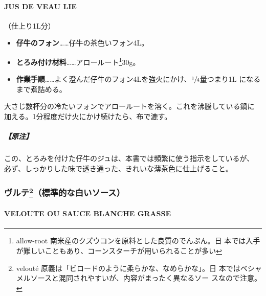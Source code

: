 \documentclass[twoside,12Q,b5j]{escoffierltjsbook}
\begin{document}
\paragraph{JUS DE VEAU LIE}\label{jus-de-veau-lie}


（仕上り1L分）

\begin{itemize}
\item
  \textbf{仔牛のフォン}\ldots{}\ldots{}仔牛の茶色いフォン4L。
\item
  \textbf{とろみ付け材料}\ldots{}\ldots{}アロールート\footnote{allow-root
    南米産のクズウコンを原料とした良質のでんぷん。日
    本では入手が難しいこともあり、コーンスターチが用いられることが多い}30g。
\item
  \textbf{作業手順}\ldots{}\ldots{}よく澄んだ仔牛のフォン4Lを強火にかけ、\(\sfrac{1}{4}\)量つまり1L
  になるまで煮詰める。
\end{itemize}

大さじ数杯分の冷たいフォンでアロールートを溶く。これを沸騰している鍋に
加える。1分程度だけ火にかけ続けたら、布で漉す。

\subparagraph{【原注】}\label{ux539fux6ce8-2}

この、とろみを付けた仔牛のジュは、本書では頻繁に使う指示をしているが、
必ず、しっかりした味で透き通った、きれいな薄茶色に仕上げること。

\vspace*{1.7\zw}

\subsubsection[ヴルテ（標準的な白いソース）]{\texorpdfstring{ヴルテ\footnote{velouté
  原義は「ビロードのように柔らかな、なめらかな」。日
  本ではベシャメルソースと混同されやすいが、内容がまったく異なるソー
  スなので注意。}（標準的な白いソース）}{ヴルテ（標準的な白いソース）}}\label{ux30f4ux30ebux30c6102013ux6a19ux6e96ux7684ux306aux767dux3044ux30bdux30fcux30b9}

\paragraph{VELOUTE OU SAUCE BLANCHE
GRASSE}\label{veloute-ou-sauce-blanche-grasse}
\end{document}
